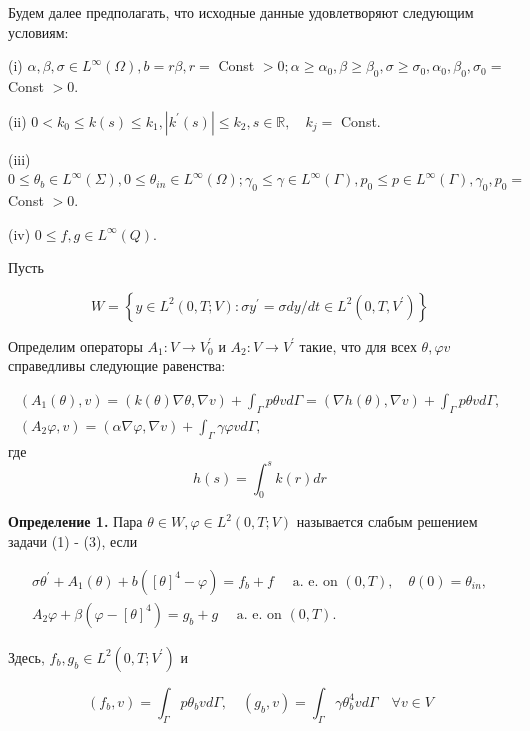 Будем далее предполагать, что исходные данные удовлетворяют следующим условиям:

(i) $\alpha, \beta, \sigma \in L^{\infty}(\Omega), b=r \beta, r=$ Const $>0;
\alpha \geq \alpha_{0}, \beta \geq \beta_{0},
\sigma \geq \sigma_{0}, \alpha_{0}, \beta_{0}, \sigma_{0}=$ Const $>0$.

(ii) $0<k_{0} \leq k(s) \leq k_{1},\left|k^{\prime}(s)\right| \leq k_{2}, s \in \mathbb{R},
\quad k_{j}=$ Const.

(iii) $0 \leq \theta_{b} \in L^{\infty}(\Sigma), 0 \leq \theta_{i n} \in L^{\infty}(\Omega);
\gamma_{0} \leq \gamma \in L^{\infty}(\Gamma),
p_{0} \leq p \in L^{\infty}(\Gamma), \gamma_{0}, p_{0}=$ Const $>0$.

(iv) $0 \leq f, g \in L^{\infty}(Q)$.

Пусть

\[
    W=\left\{y \in L^{2}(0, T ; V): \sigma y^{\prime}=\sigma d y / d t \in L^{2}\left(0, T, V^{\prime}\right)\right\}
\]

Определим операторы $A_{1}: V \rightarrow V_{0}^{\prime}$ и $A_{2}: V \rightarrow V^{\prime}$ такие,
что для всех $\theta, \varphi v$ справедливы следующие равенства:



\[
    \begin{gathered}
        \left(A_{1}(\theta), v\right)=(k(\theta) \nabla \theta, \nabla v)
        +\int_{\Gamma} p \theta v d \Gamma=(\nabla h(\theta), \nabla v)+\int_{\Gamma} p \theta v d \Gamma, \\
        \left(A_{2} \varphi, v\right)=(\alpha \nabla \varphi, \nabla v)
        +\int_{\Gamma} \gamma \varphi v d \Gamma,
    \end{gathered}
\]
где
\[
    h(s)=\int_{0}^{s} k(r) d r
\]

\textbf{Определение 1.}
Пара $\theta \in W, \varphi \in L^{2}(0, T ; V)$ называется слабым решением задачи (1) - (3), если

\[
    \begin{gathered}
        \sigma \theta^{\prime}+A_{1}(\theta)+b\left([\theta]^{4}-\varphi\right)=f_{b}+f
        \quad \text { a. e. on }(0, T), \quad \theta(0)=\theta_{i n}, \\
        A_{2} \varphi+\beta\left(\varphi-[\theta]^{4}\right)=g_{b}+g \quad \text { a. e. on }(0, T) .
    \end{gathered}
\]

Здесь, $f_{b}, g_{b} \in L^{2}\left(0, T ; V^{\prime}\right)$ и

\[
    \left(f_{b}, v\right)=\int_{\Gamma} p \theta_{b} v d \Gamma,
    \quad\left(g_{b}, v\right)=\int_{\Gamma} \gamma \theta_{b}^{4} v d \Gamma \quad \forall v \in V
\]

